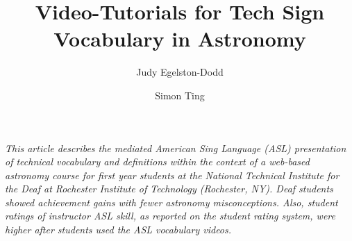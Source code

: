\documentclass[11.5pt]{sig-alternate} %
\makeatletter
\let\oldabstract\abstract
\let\oldendabstract\endabstract
\renewenvironment{abstract} %
{\renewenvironment{quotation}%
               {\list{}{\addtolength{\leftmargin}{1em} %
                        \listparindent 1.5em%
                        \itemindent    \listparindent%
                        \rightmargin   \leftmargin%
                        \parsep        \z@ \@plus\p@}%
                \item\relax}%
               {\endlist}%
\oldabstract}
{\oldendabstract}
\makeatother
\begin{document}
\title{Video-Tutorials for Tech Sign Vocabulary in Astronomy}

\author[1]{\large \color{blue}Judy Egelston-Dodd}
\author[1]{\large \color{blue}Simon Ting }


\toappear{}
\maketitle
\begin{@twocolumnfalse} 
\begin{abstract}
\item 
\textit{This article describes the mediated American Sing Language (ASL) presentation of technical vocabulary and definitions within the context of a web-based astronomy course for first year students at the National Technical Institute for the Deaf at Rochester Institute of Technology (Rochester, NY).  Deaf students showed achievement gains with fewer astronomy misconceptions. Also, student ratings of instructor ASL skill, as reported on the student rating system, were higher after students used the ASL vocabulary videos.}
\\ \\
\end{abstract}
\end{@twocolumnfalse}

\end{document}
